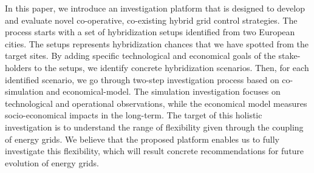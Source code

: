 \documentclass[conference]{IEEEtran}
\begin{document}
In this paper, we introduce an investigation platform that is designed  
to develop and evaluate novel co-operative, co-existing hybrid grid
control strategies. The process starts with a set of hybridization
setups identified from two European cities. The setups represents
hybridization chances that we have spotted from the target sites. 
By adding specific technological and economical goals of the 
stake-holders to the setups, we identify concrete hybridization
scenarios. Then, for each identified scenario, we go through 
two-step investigation process based on co-simulation and
economical-model. The simulation investigation focuses on
technological and operational observations, while the economical model
measures socio-economical impacts in the long-term.  
The target of this holistic investigation is to understand the
range of flexibility given through the coupling of energy grids. 
We believe that the proposed platform enables us to fully investigate
this flexibility, which will result concrete recommendations for
future evolution of energy grids. 

\end{document}
